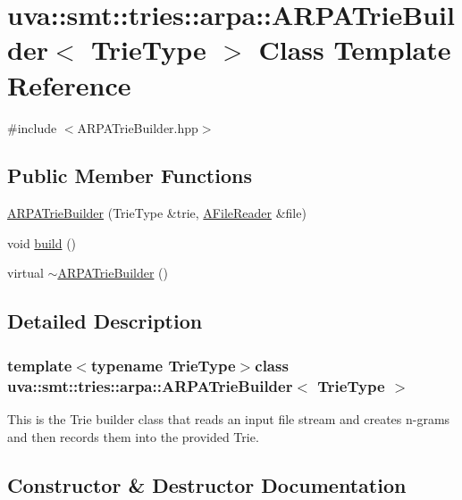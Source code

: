 \hypertarget{classuva_1_1smt_1_1tries_1_1arpa_1_1_a_r_p_a_trie_builder}{}\section{uva\+:\+:smt\+:\+:tries\+:\+:arpa\+:\+:A\+R\+P\+A\+Trie\+Builder$<$ Trie\+Type $>$ Class Template Reference}
\label{classuva_1_1smt_1_1tries_1_1arpa_1_1_a_r_p_a_trie_builder}


{\ttfamily \#include $<$A\+R\+P\+A\+Trie\+Builder.\+hpp$>$}

\subsection*{Public Member Functions}
\begin{DoxyCompactItemize}
\item 
\hyperlink{classuva_1_1smt_1_1tries_1_1arpa_1_1_a_r_p_a_trie_builder_a547b05cc83831fc8a638aa4d9bba28c3}{A\+R\+P\+A\+Trie\+Builder} (Trie\+Type \&trie, \hyperlink{classuva_1_1smt_1_1file_1_1_a_file_reader}{A\+File\+Reader} \&file)
\item 
void \hyperlink{classuva_1_1smt_1_1tries_1_1arpa_1_1_a_r_p_a_trie_builder_a6c07e6c8116f2524a2422c718d961d9b}{build} ()
\item 
virtual \hyperlink{classuva_1_1smt_1_1tries_1_1arpa_1_1_a_r_p_a_trie_builder_adbcd4624bdeb530a5b58f31a5c580523}{$\sim$\+A\+R\+P\+A\+Trie\+Builder} ()
\end{DoxyCompactItemize}


\subsection{Detailed Description}
\subsubsection*{template$<$typename Trie\+Type$>$class uva\+::smt\+::tries\+::arpa\+::\+A\+R\+P\+A\+Trie\+Builder$<$ Trie\+Type $>$}

This is the Trie builder class that reads an input file stream and creates n-\/grams and then records them into the provided Trie. 

\subsection{Constructor \& Destructor Documentation}
\hypertarget{classuva_1_1smt_1_1tries_1_1arpa_1_1_a_r_p_a_trie_builder_a547b05cc83831fc8a638aa4d9bba28c3}{}
